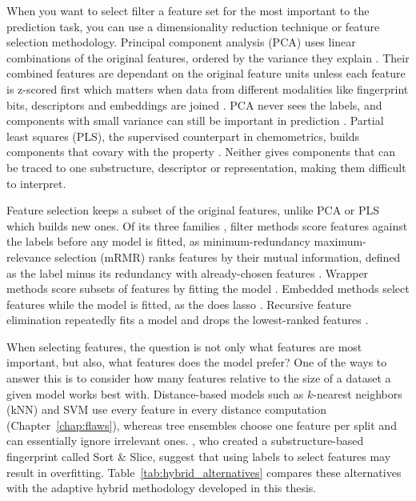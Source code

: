 When you want to select filter a feature set for the most important to the prediction task, you can use a dimensionality reduction technique or feature selection methodology. Principal component analysis (PCA) uses linear combinations of the original features, ordered by the variance they explain \citep{Jolliffe2016}. Their combined features are dependant on the original feature units unless each feature is z-scored first which matters when data from different modalities like fingerprint bits, descriptors and embeddings are joined \citep{Jolliffe2016}. PCA never sees the labels, and components with small variance can still be important in prediction \citep{Jolliffe1982}. Partial least squares (PLS), the supervised counterpart in chemometrics, builds components that covary with the property \citep{Wold2001}. Neither gives components that can be traced to one substructure, descriptor or representation, making them difficult to interpret.

Feature selection keeps a subset of the original features, unlike PCA or PLS which builds new ones. Of its three families \citep{Guyon2003}, filter methods score features against the labels before any model is fitted, as minimum-redundancy maximum-relevance selection (mRMR) ranks features by their mutual information, defined as the label minus its redundancy with already-chosen features \citep{Peng2005}. Wrapper methods score subsets of features by fitting the model \citep{Kohavi1997}. Embedded methods select features while the model is fitted, as the does lasso \citep{Tibshirani1996}. Recursive feature elimination repeatedly fits a model and drops the lowest-ranked features \citep{Guyon2002}.

When selecting features, the question is not only what features are most important, but also, what features does the model prefer? One of the ways to answer this is to consider how many features relative to the size of a dataset a given model works best with. Distance-based models such as $k$-nearest neighbors (kNN) and SVM use every feature in every distance computation (Chapter~\ref{chap:flaws}), whereas tree ensembles choose one feature per split and can essentially ignore irrelevant ones. \citet{sns}, who created a substructure-based fingerprint called Sort \& Slice, suggest that using labels to select features may result in overfitting. Table~\ref{tab:hybrid_alternatives} compares these alternatives with the adaptive hybrid methodology developed in this thesis. 


